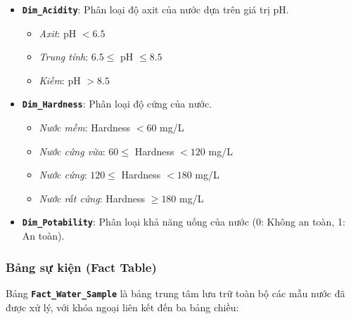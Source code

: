 \begin{itemize}
    \item \textbf{\texttt{Dim\_Acidity}}: Phân loại độ axit của nước dựa trên giá trị pH.
    \begin{itemize}
        \item \textit{Axit}: pH $< 6.5$
        \item \textit{Trung tính}: $6.5 \leq$ pH $\leq 8.5$
        \item \textit{Kiềm}: pH $> 8.5$
    \end{itemize}

    \item \textbf{\texttt{Dim\_Hardness}}: Phân loại độ cứng của nước.
    \begin{itemize}
        \item \textit{Nước mềm}: Hardness $< 60$ mg/L
        \item \textit{Nước cứng vừa}: $60 \leq$ Hardness $< 120$ mg/L
        \item \textit{Nước cứng}: $120 \leq$ Hardness $< 180$ mg/L
        \item \textit{Nước rất cứng}: Hardness $\geq 180$ mg/L
    \end{itemize}

    \item \textbf{\texttt{Dim\_Potability}}: Phân loại khả năng uống của nước (0: Không an toàn, 1: An toàn).
\end{itemize}

\subsubsection{Bảng sự kiện (Fact Table)}

Bảng \textbf{\texttt{Fact\_Water\_Sample}} là bảng trung tâm lưu trữ toàn bộ các mẫu nước đã được xử lý, với khóa ngoại liên kết đến ba bảng chiều:


